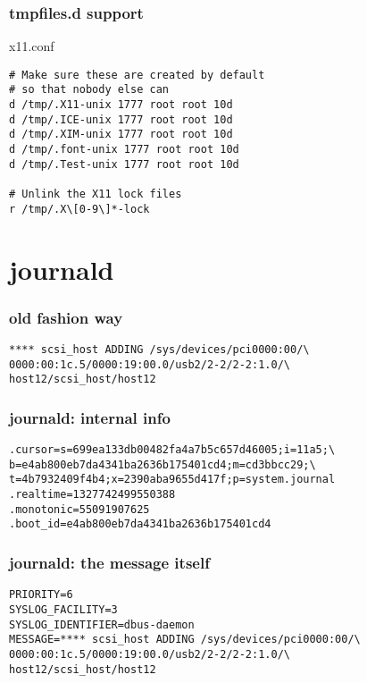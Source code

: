 \documentclass{beamer}
\begin{document}
\begin{frame}[fragile]
    \frametitle{tmpfiles.d support}
    \begin{block}{x11.conf}
    \begin{verbatim}
# Make sure these are created by default
# so that nobody else can
d /tmp/.X11-unix 1777 root root 10d
d /tmp/.ICE-unix 1777 root root 10d
d /tmp/.XIM-unix 1777 root root 10d
d /tmp/.font-unix 1777 root root 10d
d /tmp/.Test-unix 1777 root root 10d

# Unlink the X11 lock files
r /tmp/.X\[0-9\]*-lock
    \end{verbatim}
    \end{block}
\end{frame}

\section{journald}
\begin{frame}[fragile]
    \frametitle{old fashion way}
    \begin{block}{}
    \begin{verbatim}
**** scsi_host ADDING /sys/devices/pci0000:00/\
0000:00:1c.5/0000:19:00.0/usb2/2-2/2-2:1.0/\
host12/scsi_host/host12
    \end{verbatim}
    \end{block}
\end{frame}

\begin{frame}[fragile]
    \frametitle{journald: internal info}
    \begin{block}{}
    \begin{verbatim}
.cursor=s=699ea133db00482fa4a7b5c657d46005;i=11a5;\
b=e4ab800eb7da4341ba2636b175401cd4;m=cd3bbcc29;\
t=4b7932409f4b4;x=2390aba9655d417f;p=system.journal
.realtime=1327742499550388
.monotonic=55091907625
.boot_id=e4ab800eb7da4341ba2636b175401cd4
    \end{verbatim}
    \end{block}
\end{frame}

\begin{frame}[fragile]
    \frametitle{journald: the message itself}
    \begin{block}{}
    \begin{verbatim}
PRIORITY=6
SYSLOG_FACILITY=3
SYSLOG_IDENTIFIER=dbus-daemon
MESSAGE=**** scsi_host ADDING /sys/devices/pci0000:00/\
0000:00:1c.5/0000:19:00.0/usb2/2-2/2-2:1.0/\
host12/scsi_host/host12
    \end{verbatim}
    \end{block}
\end{frame}
\end{document}

